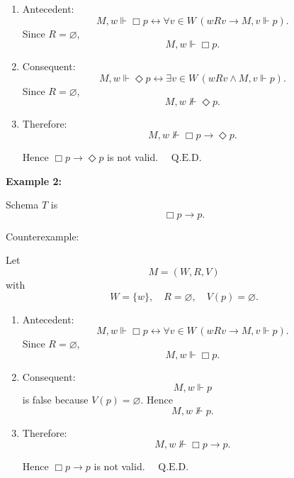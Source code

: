 \documentclass[12pt,a4paper,openany]{article}
\begin{document}
\begin{enumerate}
    \item Antecedent:
    $$M,w \Vdash \Box p
    \leftrightarrow \forall v\in W\,(wRv\to M,v \Vdash p).$$
    Since $R=\varnothing$,
    $$M,w \Vdash \Box p.$$
    
    \item Consequent:
    $$M,w \Vdash \Diamond p
    \leftrightarrow \exists v\in W\,(wRv\land M,v \Vdash p).$$
    Since $R=\varnothing$,
    $$M,w\not \Vdash \Diamond p.$$
    
    \item Therefore:
    $$M,w\not \Vdash \Box p \to \Diamond p.$$
    
    Hence $\Box p \to \Diamond p$ is not valid. $\quad \text{Q.E.D.}$
\end{enumerate}

\begin{center}
\end{center}

\textbf{Example 2:}

Schema $T$ is
$$\Box p \to p.$$

Counterexample:

Let
$$M=(W,R,V)$$
with
$$W=\{w\},\quad R=\varnothing,\quad V(p)=\varnothing.$$

\begin{enumerate}
    \item Antecedent:
    $$M,w\Vdash\Box p
    \leftrightarrow \forall v\in W\,(wRv \to M,v\Vdash p).$$
    Since $R=\varnothing$,
    $$M,w\Vdash\Box p.$$
    
    \item Consequent:
    $$M,w\Vdash p$$
    is false because $V(p)=\varnothing$. Hence
    $$M,w\not\Vdash p.$$
    
    \item Therefore:
    $$M,w\not\Vdash \Box p \to p.$$
    
    Hence $\Box p \to p$ is not valid. $\quad \text{Q.E.D.}$
\end{enumerate}
\end{document}
